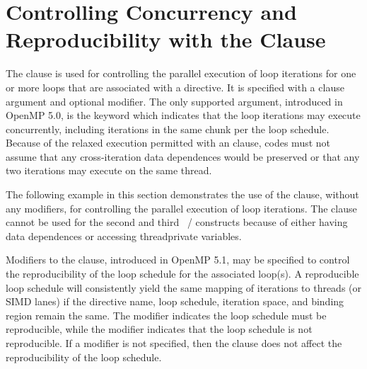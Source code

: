 \pagebreak
\section{Controlling Concurrency and Reproducibility with 
the  Clause}
\label{sec:reproducible_modifier}


The  clause is used for controlling the parallel execution of 
loop iterations for one or more loops that are associated with a directive. 
It is specified with a clause argument and optional modifier. 
The only supported argument, introduced in OpenMP 5.0, is the keyword 
 which indicates that the loop iterations may execute 
concurrently, including iterations in the same chunk per the loop schedule. 
Because of the relaxed execution permitted with an  
clause, codes must not assume that any cross-iteration data dependences 
would be preserved or that any two iterations may execute on the same thread.

The following example in this section demonstrates the use of 
the  clause, without any modifiers, for controlling 
the parallel execution of loop iterations.
The  clause cannot be used for the second and third 
~/ constructs because of either having 
data dependences or accessing threadprivate variables.



Modifiers to the  clause, introduced in OpenMP 5.1, may be 
specified to control the reproducibility of the loop schedule for 
the associated loop(s). A reproducible loop schedule will consistently 
yield the same mapping of iterations to threads (or SIMD lanes) if the 
directive name, loop schedule, iteration space, and binding region remain 
the same. The  modifier indicates the loop schedule must 
be reproducible, while the  modifier indicates that 
the loop schedule is not reproducible.
If a modifier is not specified, then the  clause does not affect 
the reproducibility of the loop schedule.

